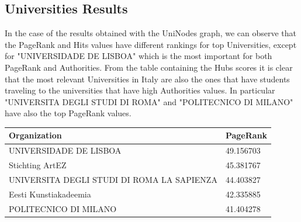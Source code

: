     \subsection*{Universities Results}
    In the case of the results obtained with the UniNodes graph, we can observe that the PageRank and Hits values 
    have different rankings for top Universities, except for "UNIVERSIDADE DE LISBOA" which is the most important
    for both PageRank and Authorities.
    From the table containing the Hubs scores it is clear that the most relevant Universities in Italy are also the 
    ones that have students traveling to the universities that have high Authorities values. 
    In particular "UNIVERSITA DEGLI STUDI DI ROMA" and "POLITECNICO DI MILANO" have also the top PageRank values.    
    \begin{table}[hbtp]
      \parbox{.25\linewidth}{
        \centering
        \begin{tabular}{l l}
            \hline
            \textbf{Organization} & \textbf{PageRank} \\ \hline
            UNIVERSIDADE DE LISBOA & 49.156703 \\
            Stichting ArtEZ & 45.381767 \\
            UNIVERSITA DEGLI STUDI DI ROMA LA SAPIENZA & 44.403827 \\
            Eesti Kunstiakadeemia & 42.335885 \\
            POLITECNICO DI MILANO & 41.404278\\\hline
          \end{tabular}
          \label{tab:table-label}
        }
      \end{table}

